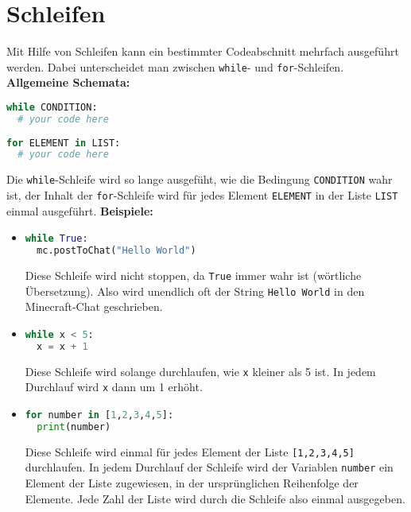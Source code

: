 \documentclass{article}
\begin{document}
	\section{Schleifen}
	Mit Hilfe von Schleifen kann ein bestimmter Codeabschnitt mehrfach ausgeführt werden. Dabei unterscheidet man zwischen \texttt{while}- und \texttt{for}-Schleifen.\\
	\textbf{Allgemeine Schemata:}
	\begin{lstlisting}[language=Python]
while CONDITION:
  # your code here
	
for ELEMENT in LIST:
  # your code here
	\end{lstlisting}
	Die \texttt{while}-Schleife wird so lange ausgefüht, wie die Bedingung \texttt{CONDITION} wahr ist, der Inhalt der \texttt{for}-Schleife wird für jedes Element \texttt{ELEMENT} in der Liste \texttt{LIST} einmal ausgeführt.
	\textbf{Beispiele:}
	\begin{itemize}
		\item[] \begin{lstlisting}[language=Python]
while True:
  mc.postToChat("Hello World")
		\end{lstlisting}
		Diese Schleife wird nicht stoppen, da \texttt{True} immer wahr ist (wörtliche Übersetzung). Also wird unendlich oft der String \texttt{Hello World} in den Minecraft-Chat geschrieben.
		
		\item[] \begin{lstlisting}[language=Python]
while x < 5:
  x = x + 1
		\end{lstlisting}
		Diese Schleife wird solange durchlaufen, wie \texttt{x} kleiner als 5 ist. In jedem Durchlauf wird \texttt{x} dann um 1 erhöht.
		
		\item[] \begin{lstlisting}[language=Python]
for number in [1,2,3,4,5]:
  print(number)
		\end{lstlisting}
		Diese Schleife wird einmal für jedes Element der Liste \texttt{[1,2,3,4,5]} durchlaufen. In jedem Durchlauf der Schleife wird der Variablen \texttt{number} ein Element der Liste zugewiesen, in der ursprünglichen Reihenfolge der Elemente. Jede Zahl der Liste wird durch die Schleife also einmal ausgegeben.
	\end{itemize}
\end{document}
